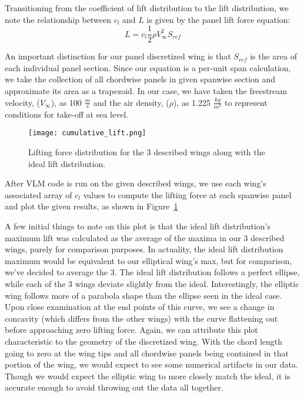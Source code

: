 \documentclass{article}
\begin{document}
Transitioning from the coefficient of lift distribution to the lift distribution, we note the relationship between $c_l$ and $L$ is given by the panel lift force equation:
\begin{equation}\label{eq:lift_force_equation}
L = c_l \frac{1}{2} \rho V_{\infty}^2 S_{ref}
\end{equation}

An important distinction for our panel discretized wing is that $S_{ref}$ is the area of each individual panel section. Since our equation is a per-unit span calculation, we take the collection of all chordwise panels in given spanwise section and approximate its area as a trapezoid. 
In our case, we have taken the freestream velocity, ($V_{\infty}$), as 100 $\frac{m}{s}$ and the air density, ($\rho$), as 1.225 $\frac{kg}{m^3}$ to represent conditions for take-off at sea level.


\begin{figure}[ht]
    \centering
    \texttt{[image: cumulative\_lift.png]}
    \caption{Lifting force distribution for the 3 described wings along with the ideal lift distribution.}\label{fig:cumulative_L}
\end{figure}

After VLM code is run on the given described wings, we use each wing's associated array of $c_l$ values to compute the lifting force at each spanwise panel and plot the given results, as shown in Figure~\ref{fig:cumulative_L}

A few initial things to note on this plot is that the ideal lift distribution's maximum lift was calculated as the average of the maxima in our 3 described wings, purely for comparison purposes. In actuality, the ideal lift distribution maximum would be equivalent to our elliptical wing's max, but for comparison, we've decided to average the 3.
The ideal lift distribution follows a perfect ellipse, while each of the 3 wings deviate slightly from the ideal. Interestingly, the elliptic wing follows more of a parabola shape than the ellipse seen in the ideal case.
Upon close examination at the end points of this curve, we see a change in concavity (which differs from the other wings) with the curve flattening out before approaching zero lifting force. Again, we can attribute this plot characteristic
to the geometry of the discretized wing. With the chord length going to zero at the wing tips and all chordwise panels being contained in that portion of the wing, we would expect to see some numerical artifacts in our data.
Though we would expect the elliptic wing to more closely match the ideal, it is accurate enough to avoid throwing out the data all together.
\end{document}
